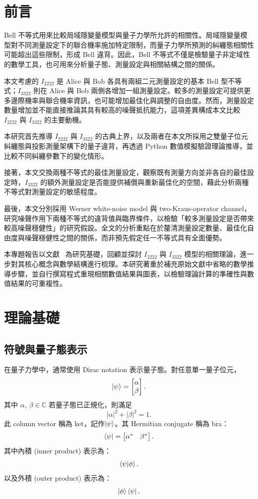 \documentclass[12pt, a4paper, twoside, reqno]{article}
\begin{document}
\section{前言}
Bell 不等式用來比較局域隱變量模型與量子力學所允許的相關性。局域隱變量模型對不同測量設定下的聯合機率施加特定限制，而量子力學所預測的糾纏態相關性可能超出這些限制，形成 Bell 違背。因此，Bell 不等式不僅是檢驗量子非定域性的數學工具，也可用來分析量子態、測量設定與相關結構之間的關係。

\indent 本文考慮的 $I_{2222}$ 是 Alice 與 Bob 各具有兩組二元測量設定的基本 Bell 型不等式；$I_{3322}$ 則在 Alice 與 Bob 兩側各增加一組測量設定。較多的測量設定可提供更多邊際機率與聯合機率資訊，也可能增加最佳化與調整的自由度。然而，測量設定數量增加並不能直接推論其具有較高的噪聲抵抗能力，這項差異構成本文比較 $I_{2222}$ 與 $I_{3322}$ 的主要動機。

\indent 本研究首先推導 $I_{2222}$ 與 $I_{3322}$ 的古典上界，以及兩者在本文所採用之雙量子位元糾纏態與投影測量架構下的量子違背，再透過 Python 數值模擬驗證理論推導，並比較不同糾纏參數下的變化情形。

\indent 接著，本文交換兩種不等式的最佳測量設定，觀察既有測量方向並非各自的最佳設定時，$I_{3322}$ 的額外測量設定是否能提供補償與重新最佳化的空間，藉此分析兩種不等式對測量設定的敏感程度。

\indent 最後，本文分別採用 Werner white-noise model 與 two-Kraus-operator channel，研究噪聲作用下兩種不等式的違背值與臨界條件，以檢驗「較多測量設定是否帶來較高噪聲穩健性」的研究假設。全文的分析重點在於釐清測量設定數量、最佳化自由度與噪聲穩健性之間的關係，而非預先假定任一不等式具有全面優勢。

\indent 本專題報告以文獻~\cite{Collins2004,Guo2021} 為研究基礎，回顧並探討 $I_{2222}$ 與 $I_{3322}$ 模型的相關理論，進一步對其核心概念與數學結構進行梳理。本研究著重於補充原始文獻中省略的數學推導步驟，並自行撰寫程式重現相關數值結果與圖表，以檢驗理論計算的準確性與數值結果的可重複性。

\section{理論基礎}
\subsection{符號與量子態表示}
在量子力學中，通常使用 Dirac notation 表示量子態。對任意單一量子位元，
\[
    \ket{\psi}=
    \begin{bmatrix}
        \alpha\\
        \beta
    \end{bmatrix}.
\]
\noindent 其中 $\alpha,~\beta \in\mathbb{C}$ 若量子態已正規化，則滿足
\[
    |\alpha|^2+|\beta|^2=1.
\]
此 column vector 稱為 ket，記作$\ket{\psi}$。其 Hermitian conjugate 稱為 bra：
\[
    \bra{\psi}=
    \begin{bmatrix}
        \alpha^* & \beta^*
    \end{bmatrix}.
\]
其中內積 (inner product) 表示為：
\[
    \braket{\psi|\phi}.
\]
\noindent 以及外積 (outer product) 表示為：
\[
    \ket{\phi}\bra{\psi}.
\]
\end{document}
